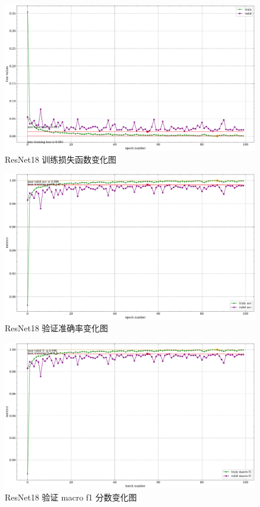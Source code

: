 \documentclass[supercite]{Experimental_Report}
\theoremstyle{definition}
\begin{document}
\begin{figure}[H]
	\begin{center}
		\includegraphics[scale=0.45]{../images/ResNet18训练验证损失函数.pdf}
		\caption{ResNet18 训练损失函数变化图}
		\label{ResNet18训练验证损失函数}
	\end{center}
\end{figure}
\begin{figure}[H]
	\begin{center}
		\includegraphics[scale=0.4]{../images/ResNet18训练验证acc.pdf}
		\caption{ResNet18 验证准确率变化图}
		\label{ResNet18训练验证acc}
	\end{center}
\end{figure}
\begin{figure}[H]
	\begin{center}
		\includegraphics[scale=0.4]{../images/ResNet18训练验证f1.pdf}
		\caption{ResNet18 验证 macro f1 分数变化图}
		\label{ResNet18训练验证f1}
	\end{center}
\end{figure}
\end{document}
